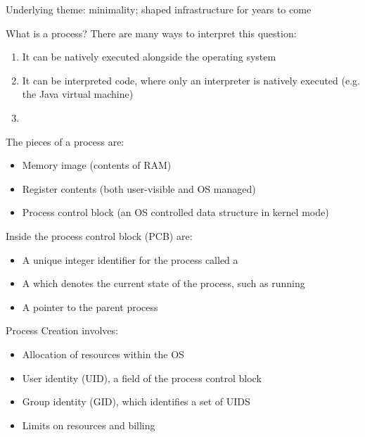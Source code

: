 \documentclass[code]{amznotes}
\begin{document}



Underlying theme: minimality; shaped infrastructure for years to come

What is a process? There are many ways to interpret this question:
\begin{enumerate}
    \item It can be natively executed alongside the operating system
    \item It can be interpreted code, where only an interpreter is natively executed (e.g. the Java virtual machine)
    \item 
\end{enumerate}


The pieces of a process are:
\begin{itemize}
    \item Memory image (contents of RAM)
    \item Register contents (both user-visible and OS managed)
    \item Process control block (an OS controlled data structure in kernel mode)
\end{itemize}

Inside the process control block (PCB) are:
\begin{itemize}
    \item A unique integer identifier for the process called a 
    \item A  which denotes the current state of the process, such as running
    \item A pointer to the parent process
\end{itemize}

Process Creation involves:
\begin{itemize}
    \item Allocation of resources within the OS
    \item User identity (UID), a field of the process control block
    \item Group identity (GID), which identifies a set of UIDS
    \item Limits on resources and billing
\end{itemize}
\end{document}
